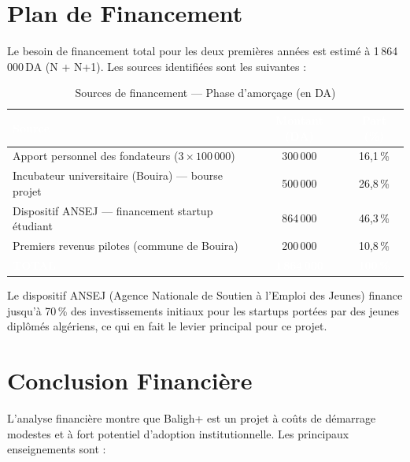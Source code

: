 \documentclass[12pt,a4paper]{report}
\newcommand{\thdcell}[1]{%
  \cellcolor{tabhead}\textbf{\textcolor{white}{#1}}%
}
\begin{document}
\section{Plan de Financement}

Le besoin de financement total pour les deux premières années est estimé à
1\,864\,000\,DA (N + N+1). Les sources identifiées sont les suivantes :

\begin{table}[H]
  \centering
  \caption{Sources de financement — Phase d'amorçage (en DA)}
  \renewcommand{\arraystretch}{1.4}
  \begin{tabularx}{\linewidth}{Xcc}
    \toprule
    \rowcolor{primary}
    \thdcell{Source} & \thdcell{Montant (DA)} & \thdcell{Part (\%)} \\
    \midrule

    Apport personnel des fondateurs ($3 \times 100\,000$) & 300\,000 & 16,1\,\% \\
    \rowcolor{lightgray}
    Incubateur universitaire (Bouira) — bourse projet      & 500\,000 & 26,8\,\% \\
    Dispositif ANSEJ — financement startup étudiant        & 864\,000 & 46,3\,\% \\
    \rowcolor{lightgray}
    Premiers revenus pilotes (commune de Bouira)           & 200\,000 & 10,8\,\% \\
    \midrule
    \rowcolor{primary}
    \textcolor{white}{\textbf{TOTAL}} &
    \textcolor{white}{\textbf{1\,864\,000}} &
    \textcolor{white}{\textbf{100\,\%}} \\
    \bottomrule
  \end{tabularx}
\end{table}

\begin{notebox}
  Le dispositif ANSEJ (Agence Nationale de Soutien à l'Emploi des Jeunes)
  finance jusqu'à 70\,\% des investissements initiaux pour les startups
  portées par des jeunes diplômés algériens, ce qui en fait le levier
  principal pour ce projet.
\end{notebox}

\section{Conclusion Financière}

L'analyse financière montre que Baligh+ est un projet à coûts de démarrage
modestes et à fort potentiel d'adoption institutionnelle. Les principaux
enseignements sont :
\end{document}
